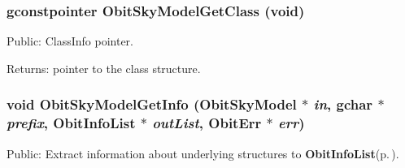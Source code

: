 \subsubsection{\setlength{\rightskip}{0pt plus 5cm}gconstpointer Obit\-Sky\-Model\-Get\-Class (void)}\label{ObitSkyModel_8h_a54}


Public: Class\-Info pointer. 

\begin{Desc}
\item[Returns:]pointer to the class structure. \end{Desc}
\subsubsection{\setlength{\rightskip}{0pt plus 5cm}void Obit\-Sky\-Model\-Get\-Info ({\bf Obit\-Sky\-Model} $\ast$ {\em in}, gchar $\ast$ {\em prefix}, {\bf Obit\-Info\-List} $\ast$ {\em out\-List}, {\bf Obit\-Err} $\ast$ {\em err})}\label{ObitSkyModel_8h_a79}


Public: Extract information about underlying structures to {\bf Obit\-Info\-List}{\rm (p.\,\pageref{structObitInfoList})}. 

